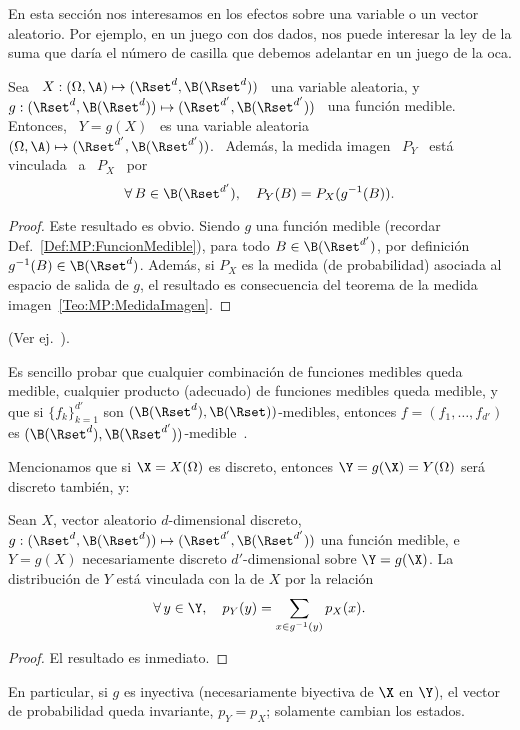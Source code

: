 \label{Sec:MP:Transformacion}

En esta secci\'on nos interesamos en  los efectos sobre una variable o un vector
aleatorio. Por ejemplo, en un juego con dos dados, nos puede interesar la ley de
la suma que dar\'ia el n\'umero de  casilla que debemos adelantar en un juego de
la oca.
%
\begin{teorema}
\label{Teo:MP:TransformacionMedible}
%
  Sea  \  $X:  (\Omega,\A)  \mapsto  (\Rset^d ,  \B(\Rset^d))$  \  una  variable
  aleatoria,   y  \   $g:  (\Rset^d   ,  \B(\Rset^d))   \mapsto   (\Rset^{d'}  ,
  \B(\Rset^{d'}))$ \  una funci\'on  medible. Entonces,  \ $Y =  g(X)$ \  es una
  variable aleatoria  \ $(\Omega,\A)  \mapsto (\Rset^{d'} ,  \B(\Rset^{d'}))$. \
  Adem\'as, la medida imagen \ $P_Y$ \ est\'a vinculada \ a \ $P_X$ \ por
  \[
  \forall \, B \in \B(\Rset^{d'}), \quad P_Y(B) = P_X(g^{-1}(B)).
  \]
\end{teorema}
%
\begin{proof}
  Este  resultado   es  obvio.  Siendo  $g$  una   funci\'on  medible  (recordar
  Def.~\ref{Def:MP:FuncionMedible}),  para  todo  $B  \in  \B(\Rset^{d'})$,  por
  definici\'on $g^{-1}(B) \in \B(\Rset^d)$.  Adem\'as, si $P_X$ es la medida (de
  probabilidad)  asociada  al  espacio  de   salida  de  $g$,  el  resultado  es
  consecuencia del teorema de la medida imagen~\ref{Teo:MP:MedidaImagen}.
\end{proof}
%
\noindent (Ver ej.~\cite{Muk00, JacPro03, AthLah06, Bog07:v2, Coh13}).

Es  sencillo probar  que  cualquier combinaci\'on  de  funciones medibles  queda
medible, cualquier  producto (adecuado) de  funciones medibles queda  medible, y
que si  $\{ f_k \}_{k=1}^{d'}$  son $(\B(\Rset^d),\B(\Rset))$-medibles, entonces
$f        =        (f_1        ,        \ldots       ,        f_{d'})$        es
$(\B(\Rset^d),\B(\Rset^{d'}))$-medible~\cite{AthLah06}.



Mencionamos   que si  $\X =  X(\Omega)$ es  discreto, entonces  $\Y =  g(\X) =
Y(\Omega)$ ser\'a discreto tambi\'en, y:
%
\begin{teorema}
\label{Teo:MP:TransformacionMasa}
%
  Sean   $X$,   vector  aleatorio   $d$-dimensional   discreto,  $g:(\Rset^d   ,
  \B(\Rset^d)) \mapsto (\Rset^{d'} , \B(\Rset^{d'}))$ una funci\'on medible, e \
  $Y =  g(X)$ necesariamente discreto  $d'$-dimensional sobre $\Y =  g(\X)$.  La
  distribuci\'on de $Y$ est\'a vinculada con la de $X$ por la relaci\'on
  \[
  \forall \, y \in \Y, \quad p_Y(y) = \sum_{x \in g^{-1}(y)} p_X(x).
  \]
\end{teorema}
%
\begin{proof}
  El resultado es inmediato.
\end{proof}
%
\noindent En particular,  si $g$ es inyectiva (necesariamente  biyectiva de $\X$
en $\Y$),  el vector  de probabilidad queda  invariante, $p_Y =  p_X$; solamente
cambian los estados.

